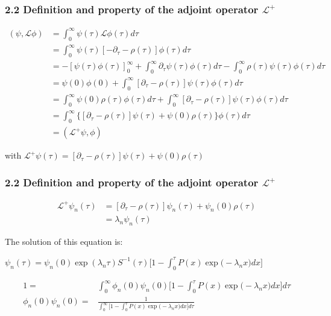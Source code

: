 \documentclass{beamer}
\begin{document}
\begin{frame}
\frametitle{2.2 Definition and property of the adjoint operator $\mathcal{L}^+$}

\begin{align}
(\psi,\mathcal{L}\phi)&= \int_{0}^{\infty}\psi(\tau)\mathcal{L}\phi(\tau)d\tau  \nonumber \\
&= \int_{0}^{\infty}\psi(\tau)[-\partial_{\tau}-\rho(\tau)]\phi(\tau)d\tau  \nonumber \\
&=-[\psi(\tau)\phi(\tau)]^{\infty}_{0}+\int_{0}^{\infty}\partial_{\tau}\psi(\tau)\phi(\tau)d\tau -\int_{0}^{\infty}\rho(\tau)\psi(\tau)\phi(\tau)d\tau \nonumber \\
&= \psi(0)\phi(0)+ \int_{0}^{\infty}[\partial_{\tau}-\rho(\tau)]\psi(\tau)\phi(\tau)d\tau  \nonumber \\
&=\int_{0}^{\infty} \psi(0)\rho(\tau)\phi(\tau)d\tau+ \int_{0}^{\infty}[\partial_{\tau}-\rho(\tau)]\psi(\tau)\phi(\tau)d\tau  \nonumber \\
&= \int_{0}^{\infty}\{[\partial_{\tau}-\rho(\tau)]\psi(\tau)+ \psi(0)\rho(\tau)\}\phi(\tau)d\tau  \nonumber \\
& = (\mathcal{L}^+\psi,\phi) \nonumber
\end{align}

with 
$
\mathcal{L}^+\psi(\tau)=[\partial_{\tau}-\rho(\tau)]\psi(\tau)+\psi(0)\rho(\tau)
$
\end{frame}

\begin{frame}
\frametitle{2.2 Definition and property of the adjoint operator $\mathcal{L}^+$}
\begin{align*}
\mathcal{L}^+\psi_n(\tau)&=[\partial_{\tau}-\rho(\tau)]\psi_n(\tau)+\psi_n(0)\rho(\tau)\\
&=\lambda_n\psi_n(\tau)
\end{align*}

The solution of this equation is:

\vspace{0.2cm}

$
\psi_n(\tau)=\psi_n(0)\exp(\lambda_n\tau)S^{-1}(\tau)\big[1-\int^\tau_0 P(x) \exp\big(-\lambda_nx)dx\big] \nonumber
$


\end{frame}

\begin{frame}
\begin{align*}
1=&\int_0^{\infty}\phi_n(0)\psi_n(0)\big[1-\int^\tau_0 P(x) \exp\big(-\lambda_nx)dx\big]d\tau \\
\phi_n(0)\psi_n(0) =&\frac{1}{\int_0^{\infty}\big[1-\int^\tau_0 P(x) \exp\big(-\lambda_nx)dx\big]d\tau}
\end{align*}
\end{frame}
\end{document}
